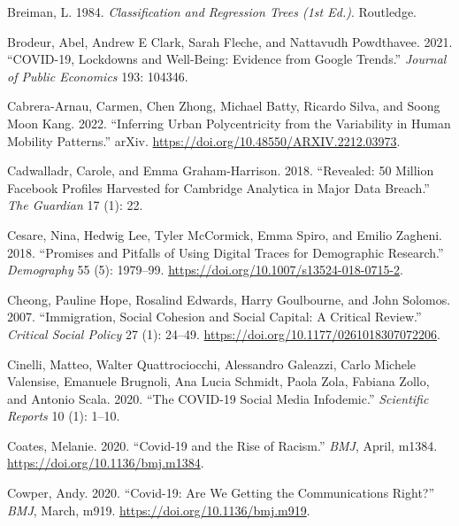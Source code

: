 \documentclass[
  letterpaper,
  DIV=11,
  numbers=noendperiod]{scrreprt}
\newlength{\cslhangindent}
\newlength{\cslentryspacingunit} %
\newenvironment{CSLReferences}[2] %
 {%
  \setlength{\parindent}{0pt}
  \ifodd #1
  \let\oldpar\par
  \def\par{\hangindent=\cslhangindent\oldpar}
  \fi
  \setlength{\parskip}{#2\cslentryspacingunit}
 }%
 {}
\begin{document}
\begin{CSLReferences}{1}{0}
\leavevmode{}%
Breiman, L. 1984. \emph{Classification and {Regression} {Trees} (1st
Ed.)}. Routledge.

\leavevmode{}%
Brodeur, Abel, Andrew E Clark, Sarah Fleche, and Nattavudh Powdthavee.
2021. {``COVID-19, Lockdowns and Well-Being: Evidence from Google
Trends.''} \emph{Journal of Public Economics} 193: 104346.

\leavevmode{}%
Cabrera-Arnau, Carmen, Chen Zhong, Michael Batty, Ricardo Silva, and
Soong Moon Kang. 2022. {``Inferring Urban Polycentricity from the
Variability in Human Mobility Patterns.''} arXiv.
\url{https://doi.org/10.48550/ARXIV.2212.03973}.

\leavevmode{}%
Cadwalladr, Carole, and Emma Graham-Harrison. 2018. {``Revealed: 50
Million Facebook Profiles Harvested for Cambridge Analytica in Major
Data Breach.''} \emph{The Guardian} 17 (1): 22.

\leavevmode{}%
Cesare, Nina, Hedwig Lee, Tyler McCormick, Emma Spiro, and Emilio
Zagheni. 2018. {``Promises and Pitfalls of Using Digital Traces for
Demographic Research.''} \emph{Demography} 55 (5): 1979--99.
\url{https://doi.org/10.1007/s13524-018-0715-2}.

\leavevmode{}%
Cheong, Pauline Hope, Rosalind Edwards, Harry Goulbourne, and John
Solomos. 2007. {``Immigration, Social Cohesion and Social Capital: A
Critical Review.''} \emph{Critical Social Policy} 27 (1): 24--49.
\url{https://doi.org/10.1177/0261018307072206}.

\leavevmode{}%
Cinelli, Matteo, Walter Quattrociocchi, Alessandro Galeazzi, Carlo
Michele Valensise, Emanuele Brugnoli, Ana Lucia Schmidt, Paola Zola,
Fabiana Zollo, and Antonio Scala. 2020. {``The COVID-19 Social Media
Infodemic.''} \emph{Scientific Reports} 10 (1): 1--10.

\leavevmode{}%
Coates, Melanie. 2020. {``Covid-19 and the Rise of Racism.''}
\emph{BMJ}, April, m1384. \url{https://doi.org/10.1136/bmj.m1384}.

\leavevmode{}%
Cowper, Andy. 2020. {``Covid-19: Are We Getting the Communications
Right?''} \emph{BMJ}, March, m919.
\url{https://doi.org/10.1136/bmj.m919}.


\end{CSLReferences}
\end{document}
